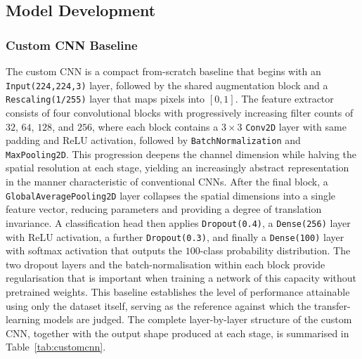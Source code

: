 \subsection{Model Development}
\label{subsec:method-models}

\subsubsection{Custom CNN Baseline}
\label{subsubsec:method-customcnn}

The custom CNN is a compact from-scratch baseline that begins with an \texttt{Input(224,224,3)} layer, followed by the shared augmentation block and a \texttt{Rescaling(1/255)} layer that maps pixels into $[0,1]$.
The feature extractor consists of four convolutional blocks with progressively increasing filter counts of $32$, $64$, $128$, and $256$, where each block contains a $3\times3$ \texttt{Conv2D} layer with same padding and ReLU activation, followed by \texttt{BatchNormalization} and \texttt{MaxPooling2D}.
This progression deepens the channel dimension while halving the spatial resolution at each stage, yielding an increasingly abstract representation in the manner characteristic of conventional CNNs.
After the final block, a \texttt{GlobalAveragePooling2D} layer collapses the spatial dimensions into a single feature vector, reducing parameters and providing a degree of translation invariance.
A classification head then applies \texttt{Dropout(0.4)}, a \texttt{Dense(256)} layer with ReLU activation, a further \texttt{Dropout(0.3)}, and finally a \texttt{Dense(100)} layer with softmax activation that outputs the $100$-class probability distribution.
The two dropout layers and the batch-normalisation within each block provide regularisation that is important when training a network of this capacity without pretrained weights.
This baseline establishes the level of performance attainable using only the dataset itself, serving as the reference against which the transfer-learning models are judged.
The complete layer-by-layer structure of the custom CNN, together with the output shape produced at each stage, is summarised in Table~\ref{tab:customcnn}.

